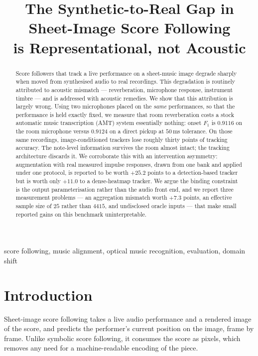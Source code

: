 \documentclass{article}
\title{The Synthetic-to-Real Gap in Sheet-Image Score Following\\
       is Representational, not Acoustic}
\begin{document}
\maketitle

\begin{abstract}
Score followers that track a live performance on a sheet-music image degrade
sharply when moved from synthesised audio to real recordings. This degradation
is routinely attributed to acoustic mismatch --- reverberation, microphone
response, instrument timbre --- and is addressed with acoustic remedies. We
show that this attribution is largely wrong. Using two microphones placed on
the \emph{same} performances, so that the performance is held exactly fixed, we
measure that room reverberation costs a stock automatic music transcription
(AMT) system essentially nothing: onset $F_1$ is $0.9116$ on the room
microphone versus $0.9124$ on a direct pickup at $50\,$ms tolerance. On those
same recordings, image-conditioned trackers lose roughly thirty points of
tracking accuracy. The note-level information survives the room almost intact;
the tracking architecture discards it. We corroborate this with an intervention
asymmetry: augmentation with real measured impulse responses, drawn from one
bank and applied under one protocol, is reported to be worth $+25.2$ points to
a detection-based tracker but is worth only $+11.0$ to a dense-heatmap tracker.
We argue the binding constraint is the output parameterisation rather than the
audio front end, and we report three measurement problems --- an aggregation
mismatch worth $+7.3$ points, an effective sample size of $25$ rather than
$4415$, and undisclosed oracle inputs --- that make small reported gains on
this benchmark uninterpretable.
\end{abstract}

\begin{keywords}
score following, music alignment, optical music recognition, evaluation,
domain shift
\end{keywords}

\section{Introduction}
\label{sec:intro}

Sheet-image score following takes a live audio performance and a rendered image
of the score, and predicts the performer's current position on the image, frame
by frame. Unlike symbolic score following, it consumes the score as pixels,
which removes any need for a machine-readable encoding of the piece.
\end{document}
